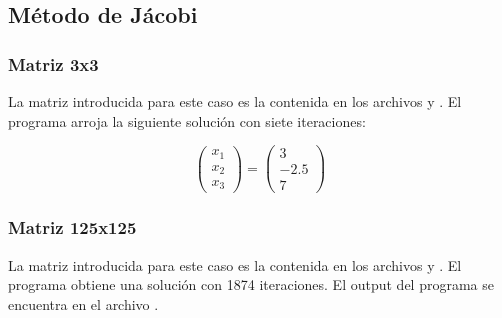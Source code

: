 \subsection{Método de Jácobi}

\subsubsection{Matriz 3x3}

La matriz introducida para este caso es la contenida en los archivos  y . El programa arroja la siguiente solución con siete iteraciones:

\begin{equation*}
    \begin{pmatrix}
        x_1 \\
        x_2 \\
        x_3
    \end{pmatrix} =
    \begin{pmatrix}
        3    \\
        -2.5 \\
        7
    \end{pmatrix}
\end{equation*}

\subsubsection{Matriz 125x125}

La matriz introducida para este caso es la contenida en los archivos  y . El programa obtiene una solución con 1874 iteraciones. El output del programa se encuentra en el archivo .

